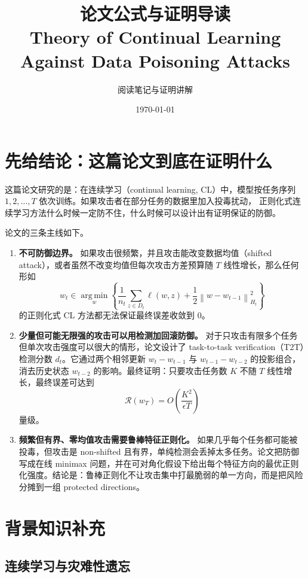 \documentclass[UTF8,fontset=none,11pt]{ctexart}
\title{\bfseries 论文公式与证明导读\\
{\large Theory of Continual Learning Against Data Poisoning Attacks}}
\author{阅读笔记与证明讲解}
\date{\today}
\theoremstyle{cnstyle}
\newcommand{\argmin}{\operatorname*{arg\,min}}
\newcommand{\calR}{\mathcal{R}}
\newcommand{\norm}[1]{\left\lVert #1\right\rVert}
\begin{document}
\maketitle
\tableofcontents
\newpage

\section{先给结论：这篇论文到底在证明什么}

这篇论文研究的是：在连续学习（continual learning, CL）中，模型按任务序列
\(1,2,\dots,T\) 依次训练。如果攻击者在部分任务的数据里加入投毒扰动，
正则化式连续学习方法什么时候一定防不住，什么时候可以设计出有证明保证的防御。

论文的三条主线如下。

\begin{enumerate}
  \item \textbf{不可防御边界。}
  如果攻击很频繁，并且攻击能改变数据均值（shifted attack），或者虽然不改变均值但每次攻击方差预算随 \(T\) 线性增长，那么任何形如
  \[
    w_t\in\argmin_w
    \left\{
      \frac{1}{n_t}\sum_{z\in D_t}\ell(w,z)
      +\frac12\norm{w-w_{t-1}}_{H_t}^2
    \right\}
  \]
  的正则化式 CL 方法都无法保证最终误差收敛到 0。

  \item \textbf{少量但可能无限强的攻击可以用检测加回滚防御。}
  对于只攻击有限多个任务但单次攻击强度可以很大的情形，论文设计了 task-to-task verification（T2T）检测分数 \(d_t\)。它通过两个相邻更新
  \(w_t-w_{t-1}\) 与 \(w_{t-1}-w_{t-2}\) 的投影组合，消去历史状态
  \(w_{t-2}\) 的影响。最终证明：只要攻击任务数 \(K\) 不随 \(T\) 线性增长，最终误差可达到
  \[
    \calR(w_T)=O\!\left(\frac{K^2}{\epsilon T}\right)
  \]
  量级。

  \item \textbf{频繁但有界、零均值攻击需要鲁棒特征正则化。}
  如果几乎每个任务都可能被投毒，但攻击是 non-shifted 且有界，单纯检测会丢掉太多任务。论文把防御写成在线 minimax 问题，并在可对角化假设下给出每个特征方向的最优正则化强度。结论是：鲁棒正则化不让攻击集中打最脆弱的单一方向，而是把风险分摊到一组 protected directions。
\end{enumerate}

\section{背景知识补充}

\subsection{连续学习与灾难性遗忘}
\end{document}
